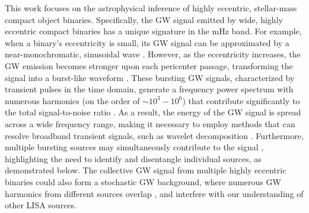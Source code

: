 \documentclass[%
 reprint,
 amsmath,amssymb,
 aps,
]{revtex4-2}
\newcommand{\xzy}[1]{\textcolor{red}{{\bf} #1}}
\begin{document}
This work focuses on the astrophysical inference of highly eccentric, stellar-mass compact object binaries. Specifically, the GW signal emitted by wide, highly eccentric compact binaries has a unique signature in the mHz band. For example, when a binary's eccentricity is small, its GW signal can be approximated by a near-monochromatic, sinusoidal wave \citep[see, e.g., ][]{Cutler+94}. However, as the eccentricity increases, the GW emission becomes stronger upon each pericenter passage, transforming the signal into a burst-like waveform \citep[e.g.,][]{Xuan+23b,Xuan24bkg}. These bursting GW signals, characterized by transient pulses in the time domain, generate a frequency power spectrum with numerous harmonics (on the order of $\sim 10^3-10^6$) that contribute significantly to the total signal-to-noise ratio \citep[see, e.g., ][]{Kocsis_2012,Xuan+23b}. As a result, the energy of the GW signal is spread across a wide frequency range, making it necessary to employ methods that can resolve broadband transient signals, such as wavelet decomposition \citep{Klimenko_2004,Chatterji2004Qtransform,Chatterji2006searchburst,bassetti2005development,Tai_2014}.
Furthermore, multiple bursting sources may simultaneously contribute to the signal \citep{Xuan+23b}, highlighting the need to identify and disentangle individual sources, as demonstrated below.  %
The collective GW signal from multiple highly eccentric binaries could also form a stochastic GW background, where numerous GW harmonics from different sources overlap \citep{Xuan24bkg}, and interfere with our understanding of other LISA sources. 
\end{document}
